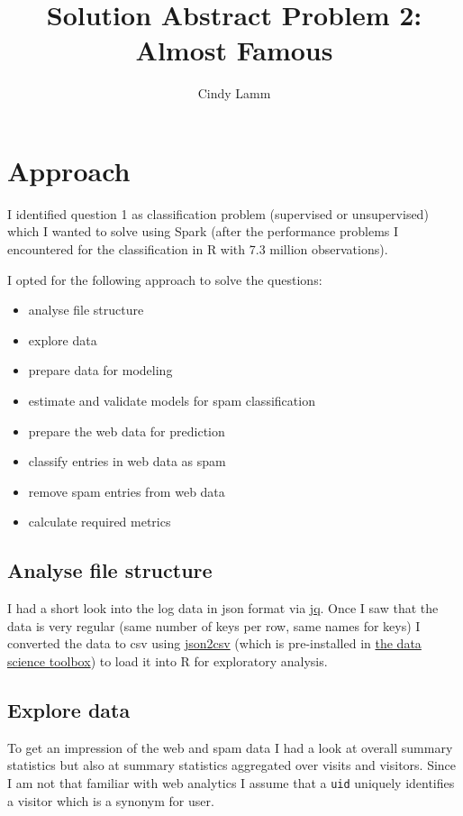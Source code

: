 \documentclass{article}\usepackage[]{graphicx}\usepackage[]{color}
\begin{document}
\VerbatimFootnotes

\author{Cindy Lamm}
\title{Solution Abstract Problem 2: Almost Famous}

\maketitle


\section{Approach} %
\label{approach}

I identified question 1 as classification problem (supervised or unsupervised) which I wanted to solve using Spark (after the performance problems I encountered for the classification in R with 7.3 million observations). 

I opted for the following approach to solve the questions:
\begin{itemize}
	\item analyse file structure
	\item explore data
	\item prepare data for modeling
	\item estimate and validate models for spam classification
	\item prepare the web data for prediction
	\item classify entries in web data as spam
	\item remove spam entries from web data
	\item calculate required metrics
\end{itemize}



\subsection{Analyse file structure} %
\label{sub:analyse_file_structure}
I had a short look into the log data in json format via \href{http://stedolan.github.io/jq/}{jq}. Once I saw that the data is very regular (same number of keys per row, same names for keys) I converted the data to csv using \href{https://github.com/zemirco/json2csv}{json2csv} (which is pre-installed in \href{http://datasciencetoolbox.org/}{the data science toolbox}) to load it into R for exploratory analysis.



\subsection{Explore data} %
\label{sub:explore_data}
To get an impression of the web and spam data I had a look at overall summary statistics but also at summary statistics aggregated over visits and visitors. Since I am not that familiar with web analytics I assume that a \verb+uid+ uniquely identifies a visitor which is a synonym for user. 
\end{document}
